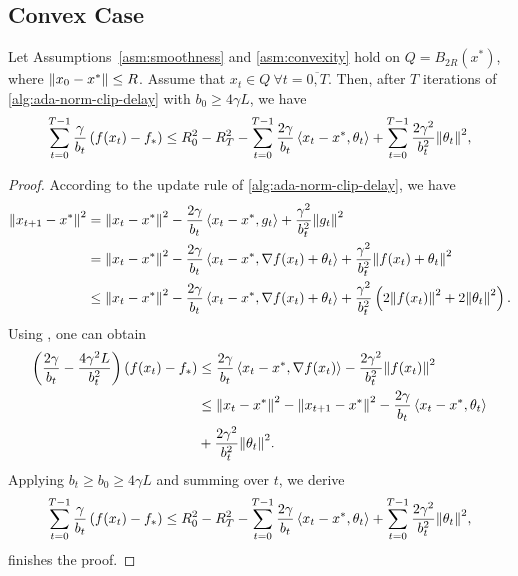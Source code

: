 \documentclass{article}
\begin{document}
\subsection{Convex Case}
\begin{lemma}
    \label{lem:descent}
    Let Assumptions~\ref{asm:smoothness} and \ref{asm:convexity} hold on $Q = B_{2R}(x^*)$, where $\left\lVert x_0 - x^*\right\rVert \leq R$. Assume that $x_t \in Q \ \forall t = \overline{0, T}$. Then, after $T$ iterations of \cref{alg:ada-norm-clip-delay} with $b_0 \geq 4\gamma L$, we have
    \begin{align*}
         \sum\limits_{t=0}^{T-1} \frac{\gamma}{b_t}\left(f(x_t) - f_*\right) \leq R_0^2 - R_{T}^2 - \sum\limits_{t=0}^{T-1} \frac{2\gamma}{b_t}\left \langle x_t - x^*, \theta_t \right \rangle + \sum\limits_{t=0}^{T-1} \frac{2\gamma^2}{b_t^2}{\left\lVert\theta_t\right\rVert}^2,
    \end{align*}
\end{lemma}
\begin{proof}
    According to the update rule of \cref{alg:ada-norm-clip-delay}, we have
    \begin{align*}
        {\left\lVert x_{t+1} - x^*\right\rVert}^2 &= {\left\lVert x_t - x^*\right\rVert}^2 - \frac{2\gamma}{b_t}\left \langle x_t - x^*, g_t \right \rangle + \frac{\gamma^2}{b_t^2}{\left\lVert g_t\right\rVert}^2\\
        &= {\left\lVert x_t - x^*\right\rVert}^2 - \frac{2\gamma}{b_t}\left \langle x_t - x^*, \nabla f(x_t) + \theta_t \right \rangle + \frac{\gamma^2}{b_t^2}{\left\lVert f(x_t) + \theta_t\right\rVert}^2 \\
        &\leq {\left\lVert x_t - x^*\right\rVert}^2 - \frac{2\gamma}{b_t}\left \langle x_t - x^*, \nabla f(x_t) + \theta_t \right \rangle + \frac{\gamma^2}{b_t^2}\left(2{\left\lVert f(x_t)\right\rVert}^2 + 2{\left\lVert\theta_t\right\rVert}^2\right).
    \end{align*} 
    Using , one can obtain
    \begin{align*}
        \left(\frac{2\gamma}{b_t} -  \frac{4\gamma^2L}{b_t^2}\right)\left(f(x_t) - f_*\right) &\leq \frac{2\gamma}{b_t}\left \langle x_t - x^*, \nabla f(x_t) \right \rangle - \frac{2\gamma^2}{b_t^2}{\left\lVert f(x_t)\right\rVert}^2\\ &\leq {\left\lVert x_t - x^*\right\rVert}^2 - {\left\lVert x_{t+1} - x^*\right\rVert}^2 - \frac{2\gamma}{b_t}\left \langle x_t - x^*, \theta_t \right \rangle\\ &+ \frac{2\gamma^2}{b_t^2}{\left\lVert\theta_t\right\rVert}^2.
    \end{align*} 
    Applying $b_t \geq b_0 \geq 4\gamma L$ and summing over $t$, we derive
    \begin{align*}
        \sum\limits_{t=0}^{T-1} \frac{\gamma}{b_t}\left(f(x_t) - f_*\right) \leq R_0^2 - R_{T}^2 - \sum\limits_{t=0}^{T-1} \frac{2\gamma}{b_t}\left \langle x_t - x^*, \theta_t \right \rangle + \sum\limits_{t=0}^{T-1} \frac{2\gamma^2}{b_t^2}{\left\lVert\theta_t\right\rVert}^2,
    \end{align*}
     finishes the proof.
\end{proof}
\end{document}
